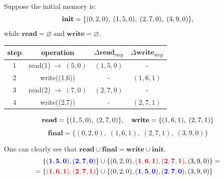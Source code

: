 \documentclass{zkdl-presentation-template}
\begin{document}
    \begin{frame}
        \begin{example}
            Suppose the initial memory is:
            \vspace{-5px}
            \begin{equation*}
                \mathbf{init} =\{(0,2,0), \; (1,5,0), \; (2,7,0), \; (3,9,0)\},
                \vspace{-5px}
            \end{equation*}
            while $\mathbf{read} = \varnothing \; \text{and} \; \mathbf{write} = \varnothing$.

            
            \vspace{6px}
            \begin{center}
                \begin{tabular}{c|c|c|c}
                \textbf{step} & \textbf{operation} & $\Delta\mathbf{read}_{\text{step}}$ & $\Delta\mathbf{write}_{\text{step}}$\\\hline
                1 & read(1)$  \; \to \; (5, 0)$ & $(1,5,0)$ & -        \\
                2 & write((1,6))                & -         & $(1,6,1)$\\
                3 & read(2)$  \; \to \; (7, 0)$ & $(2,7,0)$ & -        \\
                4 & write((2,7))                & -         & $(2,7,1)$\\
                \end{tabular}
            \end{center}
            
            \vspace{5px}
            \begin{equation*}
                \mathbf{read} = \{(1,5,0), \; (2,7,0)\},\quad
                \mathbf{write} = \{(1,6,1), \; (2,7,1)\}
                \vspace{-5px}
            \end{equation*}
            \begin{equation*}
                \mathbf{final} = \{(0,2,0), \; (1,6,1), \; (2,7,1), \; (3,9,0)\}
            \end{equation*}
            
            One can clearly see that $\mathbf{read} \cup \mathbf{final} = \mathbf{write} \cup \mathbf{init}$.
            \vspace{-5px}
            \begin{align*}
                \{\textcolor{blue}{\mathbf{(1,5,0), (2,7,0)}}\} &\cup \{(0,2,0), \textcolor{red}{\mathbf{(1,6,1), (2,7,1)}}, (3,9,0)\} = \\
                = \{\textcolor{red}{\mathbf{(1,6,1), (2,7,1)}}\} &\cup \{(0,2,0), \textcolor{blue}{\mathbf{(1,5,0), (2,7,0)}}, (3,9,0)\}
            \end{align*}
        \end{example}
    \end{frame}
\end{document}
